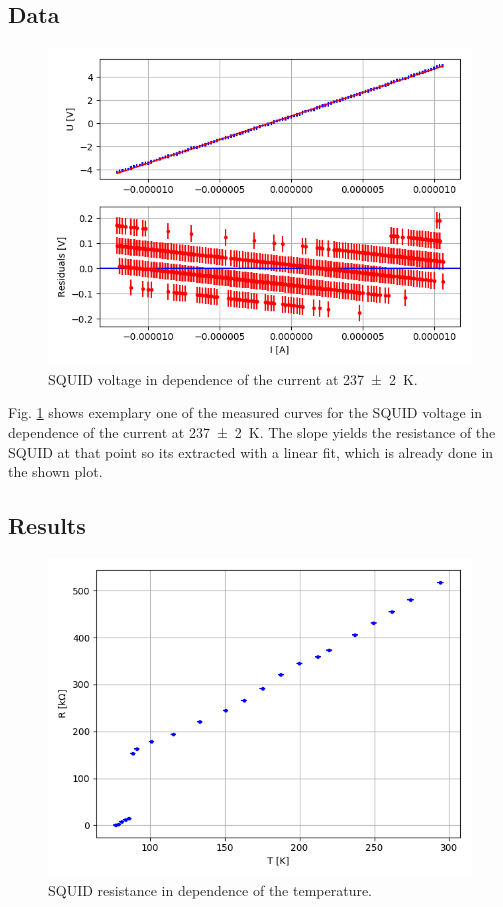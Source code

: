 \documentclass[12pt,a4paper]{article}
\begin{document}
\subsection{Data}

\begin{figure} [H]
\centering
\includegraphics[scale=0.8]{Bilder/Critical_Temperature/Resistance_fit_13.PNG}
\caption{SQUID voltage in dependence of the current at \SI{237 \pm 2}{K}.}
\label{fig:Temp_Resistance_example}
\end{figure}

Fig. \ref{fig:Temp_Resistance_example} shows exemplary one of the measured curves for the SQUID voltage in dependence of the current at \SI{237 \pm 2}{K}. The slope yields the resistance of the SQUID at that point so its extracted with a linear fit, which is already done in the shown plot.

\subsection{Results}

\begin{figure} [H]
\centering
\includegraphics[scale=0.8]{Bilder/Critical_Temperature/Temp_Resistance.PNG}
\caption{SQUID resistance in dependence of the temperature.}
\label{fig:Temp_Resistance}
\end{figure}
\end{document}
